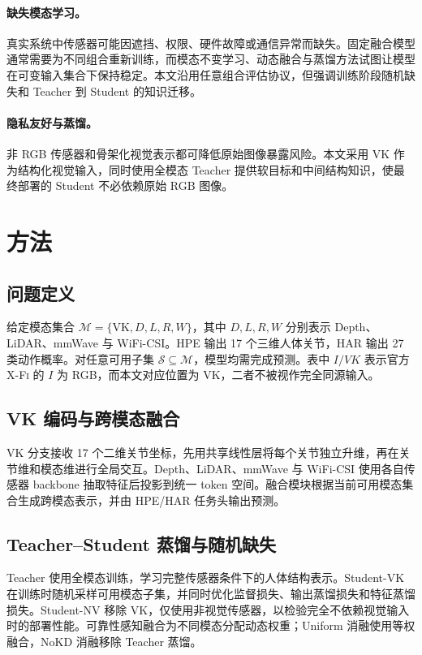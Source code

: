 \documentclass[UTF8,10pt,a4paper]{ctexart}
\newcommand{\xfi}{\textsc{X-Fi}}
\begin{document}
\paragraph{缺失模态学习。}
真实系统中传感器可能因遮挡、权限、硬件故障或通信异常而缺失。固定融合模型通常需要为不同组合重新训练，而模态不变学习、动态融合与蒸馏方法试图让模型在可变输入集合下保持稳定。本文沿用任意组合评估协议，但强调训练阶段随机缺失和 Teacher 到 Student 的知识迁移。
\paragraph{隐私友好与蒸馏。}
非 RGB 传感器和骨架化视觉表示都可降低原始图像暴露风险。本文采用 VK 作为结构化视觉输入，同时使用全模态 Teacher 提供软目标和中间结构知识，使最终部署的 Student 不必依赖原始 RGB 图像。

\section{方法}
\subsection{问题定义}
给定模态集合 $\mathcal{M}=\{\mathrm{VK},D,L,R,W\}$，其中 $D,L,R,W$ 分别表示 Depth、LiDAR、mmWave 与 WiFi-CSI。HPE 输出 17 个三维人体关节，HAR 输出 27 类动作概率。对任意可用子集 $\mathcal{S}\subseteq\mathcal{M}$，模型均需完成预测。表中 $I/VK$ 表示官方 \xfi{} 的 $I$ 为 RGB，而本文对应位置为 VK，二者不被视作完全同源输入。

\subsection{VK 编码与跨模态融合}
VK 分支接收 17 个二维关节坐标，先用共享线性层将每个关节独立升维，再在关节维和模态维进行全局交互。Depth、LiDAR、mmWave 与 WiFi-CSI 使用各自传感器 backbone 抽取特征后投影到统一 token 空间。融合模块根据当前可用模态集合生成跨模态表示，并由 HPE/HAR 任务头输出预测。

\subsection{Teacher--Student 蒸馏与随机缺失}
Teacher 使用全模态训练，学习完整传感器条件下的人体结构表示。Student-VK 在训练时随机采样可用模态子集，并同时优化监督损失、输出蒸馏损失和特征蒸馏损失。Student-NV 移除 VK，仅使用非视觉传感器，以检验完全不依赖视觉输入时的部署性能。可靠性感知融合为不同模态分配动态权重；Uniform 消融使用等权融合，NoKD 消融移除 Teacher 蒸馏。
\end{document}
